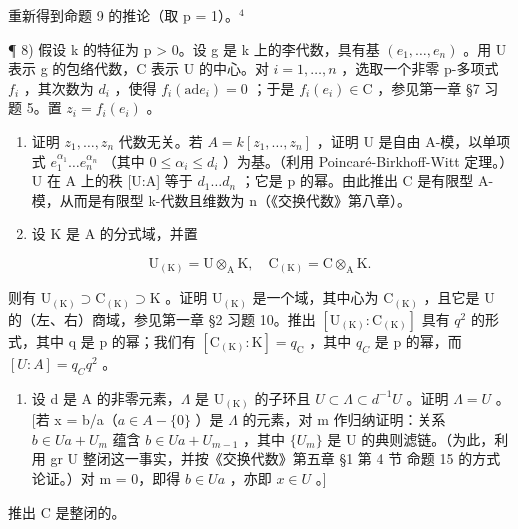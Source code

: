 重新得到命题 9 的推论（取 p = 1）。\(^{4}\)

¶ 8) 假设 k 的特征为 p \textgreater{} 0。设 g 是 k 上的李代数，具有基 \((e_{1},\ldots,e_{n})\) 。用 U 表示 g 的包络代数，C 表示 U 的中心。对 \(i = 1,\ldots,n\) ，选取一个非零 p-多项式 \(f_{i}\) ，其次数为 \(d_{i}\) ，使得 \(f_{i}(\mathrm{ad}e_{i}) = 0\) ；于是 \(f_{i}(e_{i}) \in \mathrm{C}\) ，参见第一章 §7 习题 5。置 \(z_{i} = f_{i}(e_{i})\) 。

\begin{enumerate}
\def\labelenumi{\alph{enumi})}
\item
  证明 \(z_{1},\ldots,z_{n}\) 代数无关。若 \(A=k[z_{1},\ldots,z_{n}]\) ，证明 U 是自由 A-模，以单项式 \(e_{1}^{\alpha_{1}}\ldots e_{n}^{\alpha_{n}}\) （其中 \(0\leq\alpha_{i}\leq d_{i}\) ）为基。（利用 Poincaré-Birkhoff-Witt 定理。）U 在 A 上的秩 {[}U:A{]} 等于 \(d_{1}\ldots d_{n}\) ；它是 p 的幂。由此推出 C 是有限型 A-模，从而是有限型 k-代数且维数为 n（《交换代数》第八章）。
\item
  设 \(\mathrm{K}\) 是 \(\mathrm{A}\) 的分式域，并置
\end{enumerate}

\[
\mathrm{U} _ {(\mathrm{K})} = \mathrm{U} \otimes_ {\mathrm{A}} \mathrm{K}, \quad \mathrm{C} _ {(\mathrm{K})} = \mathrm{C} \otimes_ {\mathrm{A}} \mathrm{K}.
\]

则有 \(\mathrm{U}_{(\mathrm{K})}\supset\mathrm{C}_{(\mathrm{K})}\supset\mathrm{K}\) 。证明 \(\mathrm{U}_{(\mathrm{K})}\) 是一个域，其中心为 \(\mathrm{C}_{(\mathrm{K})}\) ，且它是 U 的（左、右）商域，参见第一章 §2 习题 10。推出 \([\mathrm{U}_{(\mathrm{K})}:\mathrm{C}_{(\mathrm{K})}]\) 具有 \(q^{2}\) 的形式，其中 q 是 p 的幂；我们有 \([\mathrm{C}_{(\mathrm{K})}:\mathrm{K}]=q_{\mathrm{C}}\) ，其中 \(q_{C}\) 是 p 的幂，而 \([U:A]=q_{C}q^{2}\) 。

\begin{enumerate}
\def\labelenumi{\alph{enumi})}
\setcounter{enumi}{2}
\tightlist
\item
  设 d 是 A 的非零元素，\(\Lambda\) 是 \(\mathrm{U}_{(\mathrm{K})}\) 的子环且 \(U \subset \Lambda \subset d^{-1}U\) 。证明 \(\Lambda = U\) 。{[}若 x = b/a（\(a \in A - \{0\}\) ）是 \(\Lambda\) 的元素，对 m 作归纳证明：关系 \(b \in Ua + U_m\) 蕴含 \(b \in Ua + U_{m-1}\) ，其中 \(\{U_m\}\) 是 U 的典则滤链。（为此，利用 gr U 整闭这一事实，并按《交换代数》第五章 §1 第 4 节 命题 15 的方式论证。）对 m = 0，即得 \(b \in Ua\) ，亦即 \(x \in U\) 。{]}
\end{enumerate}

推出 C 是整闭的。

